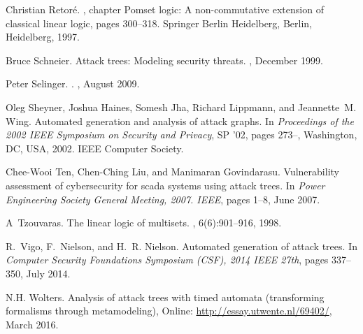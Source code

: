\documentclass{sigplanconf}
\begin{document}
\begin{thebibliography}{10}
Christian Retor{\'e}.
, chapter Pomset logic: A non-commutative
  extension of classical linear logic, pages 300--318.
\newblock Springer Berlin Heidelberg, Berlin, Heidelberg, 1997.

Bruce Schneier.
\newblock Attack trees: Modeling security threats.
, December 1999.

Peter {Selinger}.
.
, August 2009.

Oleg Sheyner, Joshua Haines, Somesh Jha, Richard Lippmann, and Jeannette~M.
  Wing.
\newblock Automated generation and analysis of attack graphs.
\newblock In {\em Proceedings of the 2002 IEEE Symposium on Security and
  Privacy}, SP '02, pages 273--, Washington, DC, USA, 2002. IEEE Computer
  Society.

Chee-Wooi Ten, Chen-Ching Liu, and Manimaran Govindarasu.
\newblock Vulnerability assessment of cybersecurity for scada systems using
  attack trees.
\newblock In {\em Power Engineering Society General Meeting, 2007. IEEE}, pages
  1--8, June 2007.

A~Tzouvaras.
\newblock The linear logic of multisets.
, 6(6):901--916, 1998.

R.~Vigo, F.~Nielson, and H.~R. Nielson.
\newblock Automated generation of attack trees.
\newblock In {\em Computer Security Foundations Symposium (CSF), 2014 IEEE
  27th}, pages 337--350, July 2014.

N.H. {Wolters}.
\newblock Analysis of attack trees with timed automata (transforming formalisms
  through metamodeling), Online: \url{http://essay.utwente.nl/69402/},
  March 2016.  
  
\end{thebibliography}


\appendix
\end{document}

